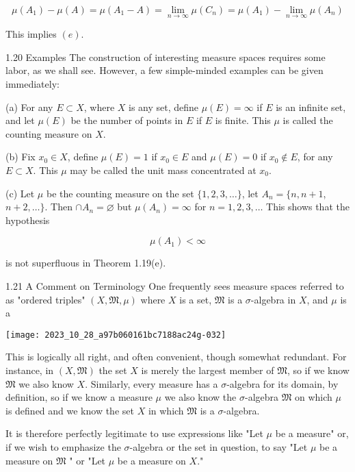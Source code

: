 \documentclass[10pt]{article}
\begin{document}
$$
\mu\left(A_{1}\right)-\mu(A)=\mu\left(A_{1}-A\right)=\lim _{n \rightarrow \infty} \mu\left(C_{n}\right)=\mu\left(A_{1}\right)-\lim _{n \rightarrow \infty} \mu\left(A_{n}\right)
$$

This implies $(e)$.

1.20 Examples The construction of interesting measure spaces requires some labor, as we shall see. However, a few simple-minded examples can be given immediately:

(a) For any $E \subset X$, where $X$ is any set, define $\mu(E)=\infty$ if $E$ is an infinite set, and let $\mu(E)$ be the number of points in $E$ if $E$ is finite. This $\mu$ is called the counting measure on $X$.

(b) Fix $x_{0} \in X$, define $\mu(E)=1$ if $x_{0} \in E$ and $\mu(E)=0$ if $x_{0} \notin E$, for any $E \subset X$. This $\mu$ may be called the unit mass concentrated at $x_{0}$.

(c) Let $\mu$ be the counting measure on the set $\{1,2,3, \ldots\}$, let $A_{n}=\{n, n+1$, $n+2, \ldots\}$. Then $\cap A_{n}=\varnothing$ but $\mu\left(A_{n}\right)=\infty$ for $n=1,2,3, \ldots$ This shows that the hypothesis

$$
\mu\left(A_{1}\right)<\infty
$$

is not superfluous in Theorem 1.19(e).

1.21 A Comment on Terminology One frequently sees measure spaces referred to as "ordered triples" $(X, \mathfrak{M}, \mu)$ where $X$ is a set, $\mathfrak{M}$ is a $\sigma$-algebra in $X$, and $\mu$ is a

\begin{center}
\texttt{[image: 2023\_10\_28\_a97b060161bc7188ac24g-032]}
\end{center}

This is logically all right, and often convenient, though somewhat redundant. For instance, in $(X, \mathfrak{M})$ the set $X$ is merely the largest member of $\mathfrak{M}$, so if we know $\mathfrak{M}$ we also know $X$. Similarly, every measure has a $\sigma$-algebra for its domain, by definition, so if we know a measure $\mu$ we also know the $\sigma$-algebra $\mathfrak{M}$ on which $\mu$ is defined and we know the set $X$ in which $\mathfrak{M}$ is a $\sigma$-algebra.

It is therefore perfectly legitimate to use expressions like "Let $\mu$ be a measure" or, if we wish to emphasize the $\sigma$-algebra or the set in question, to say "Let $\mu$ be a measure on $\mathfrak{M}$ " or "Let $\mu$ be a measure on $X$."
\end{document}
